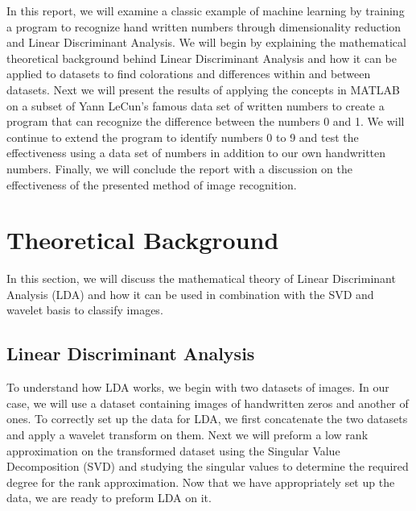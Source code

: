 \documentclass[12pt]{article}%
\numberwithin{equation}{subsection}
\begin{document}
In this report, we will examine a classic example of machine learning by training a program to recognize hand written numbers through dimensionality reduction and Linear Discriminant Analysis. We will begin by explaining the mathematical theoretical background behind Linear Discriminant Analysis and how it can be applied to datasets to find colorations and differences within and between datasets. Next we will present the results of applying the concepts in MATLAB on a subset of Yann LeCun's famous data set of written numbers to create a program that can recognize the difference between the numbers 0 and 1. We will continue to extend the program to identify numbers 0 to 9 and test the effectiveness using a data set of numbers in addition to our own handwritten numbers. Finally, we will conclude the report with a discussion on the effectiveness of the presented method of image recognition.



\section{Theoretical Background}

In this section, we will discuss the mathematical theory of Linear Discriminant Analysis (LDA) and how it can be used in combination with the SVD and wavelet basis to classify images. 


\subsection{Linear Discriminant Analysis}

To understand how LDA works, we begin with two datasets of images. In our case, we will use a dataset containing images of handwritten zeros and another of ones. To correctly set up the data for LDA, we first concatenate the two datasets and apply a wavelet transform on them. Next we will preform a low rank approximation on the transformed dataset using the Singular Value Decomposition (SVD) and studying the singular values to determine the required degree for the rank approximation. Now that we have appropriately set up the data, we are ready to preform LDA on it.
\end{document}
